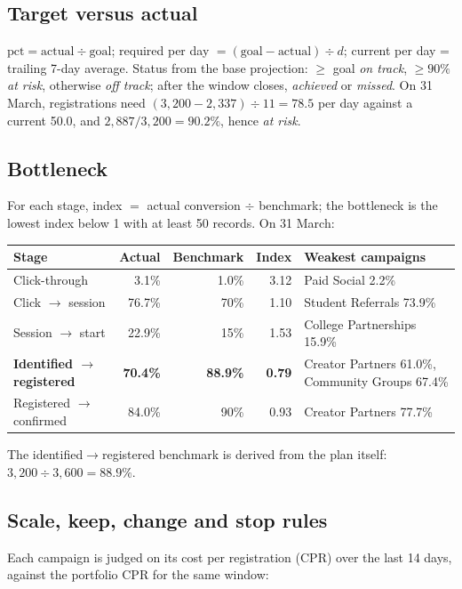\documentclass[11pt,a4paper]{article}
\begin{document}
\subsection{Target versus actual}
$\text{pct} = \text{actual} \div \text{goal}$; required per day $= (\text{goal} - \text{actual}) \div d$; current per day = trailing 7-day average. Status from the base projection: $\ge$ goal \emph{on track}, $\ge 90\%$ \emph{at risk}, otherwise \emph{off track}; after the window closes, \emph{achieved} or \emph{missed}. On 31 March, registrations need $(3{,}200 - 2{,}337) \div 11 = 78.5$ per day against a current 50.0, and $2{,}887 / 3{,}200 = 90.2\%$, hence \emph{at risk}.

\subsection{Bottleneck}
For each stage, index $=$ actual conversion $\div$ benchmark; the bottleneck is the lowest index below 1 with at least 50 records. On 31 March:

\begin{center}\small
\begin{tabular}{@{}lrrrl@{}}
\toprule
\textbf{Stage} & \textbf{Actual} & \textbf{Benchmark} & \textbf{Index} & \textbf{Weakest campaigns} \\
\midrule
Click-through & 3.1\% & 1.0\% & 3.12 & Paid Social 2.2\% \\
Click $\to$ session & 76.7\% & 70\% & 1.10 & Student Referrals 73.9\% \\
Session $\to$ start & 22.9\% & 15\% & 1.53 & College Partnerships 15.9\% \\
\textbf{Identified $\to$ registered} & \textbf{70.4\%} & \textbf{88.9\%} & \textbf{0.79} & Creator Partners 61.0\%, Community Groups 67.4\% \\
Registered $\to$ confirmed & 84.0\% & 90\% & 0.93 & Creator Partners 77.7\% \\
\bottomrule
\end{tabular}
\end{center}
The identified$\to$registered benchmark is derived from the plan itself: $3{,}200 \div 3{,}600 = 88.9\%$.

\subsection{Scale, keep, change and stop rules}
Each campaign is judged on its cost per registration (CPR) over the last 14 days, against the portfolio CPR for the same window:
\end{document}
